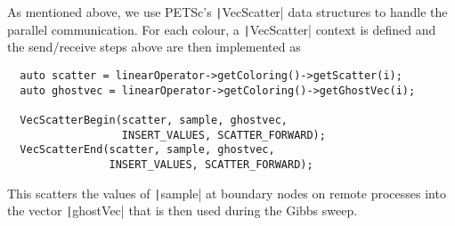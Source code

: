 \documentclass[
fontsize=11pt,
paper=a4,
numbers=noenddot
]{scrartcl}
\begin{document}

As mentioned above, we use PETSc's \texttt|VecScatter| data structures to handle the parallel communication. For each colour, a \texttt|VecScatter| context is defined and the send/receive steps above are then implemented as
\begin{verbatim}
  auto scatter = linearOperator->getColoring()->getScatter(i);
  auto ghostvec = linearOperator->getColoring()->getGhostVec(i);

  VecScatterBegin(scatter, sample, ghostvec, 
                  INSERT_VALUES, SCATTER_FORWARD);
  VecScatterEnd(scatter, sample, ghostvec, 
                INSERT_VALUES, SCATTER_FORWARD);
\end{verbatim}
This scatters the values of \texttt|sample| at boundary nodes on remote processes into the vector \texttt|ghostVec| that is then used during the Gibbs sweep. 
\end{document}

